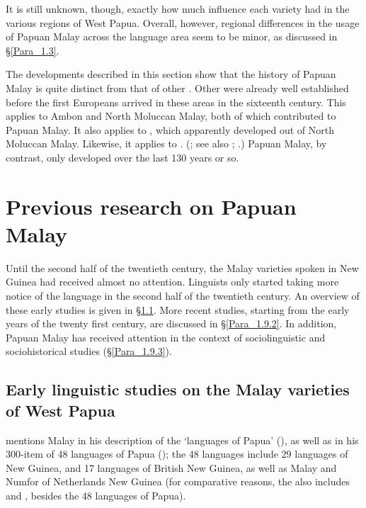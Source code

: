 {It is still unknown, though, exactly how much influence each variety had in the various regions of West Papua. Overall, however, regional differences in the usage of Papuan Malay across the language area seem to be minor, as discussed in §\ref{Para_1.3}.

\newpage 
The developments described in this section show that the history of Papuan Malay is quite distinct from that of other . Other  were already well established before the first Europeans arrived in these areas in the sixteenth century. This applies to Ambon and North Moluccan Malay, both of which contributed to Papuan Malay. It also applies to , which apparently developed out of North Moluccan Malay. Likewise, it applies to . (\citealt[42--79]{Paauw.2009}; see also \citealt{Adelaar.1996}; \citealt{Collins.1998}.) Papuan Malay, by contrast, only developed over the last 130 years or so.


\section{Previous research on Papuan Malay}\label{Para_1.9}
Until the second half of the twentieth century, the Malay varieties spoken in New Guinea had received almost no attention. Linguists only started taking more notice of the language in the second half of the twentieth century. An overview of these early studies is given in §\ref{Para_1.9.1}. More recent studies, starting from the early years of the twenty first century, are discussed in §\ref{Para_1.9.2}. In addition, Papuan Malay has received attention in the context of sociolinguistic and sociohistorical studies (§\ref{Para_1.9.3}).


\subsection{Early linguistic studies on the Malay varieties of West Papua}\label{Para_1.9.1}
\citet{Zoller.1891} mentions Malay in his description of the  ‘languages of Papua’ (\citeyear*[351–426]{Zoller.1891}), as well as in his 300-item  of 48 languages of Papua (\citeyear*[443–529]{Zoller.1891}); the 48 languages include 29 languages of  New Guinea, and 17 languages of British New Guinea, as well as Malay and Numfor of Netherlands New Guinea (for comparative reasons, the  also includes  and , besides the 48 languages of Papua).



}
